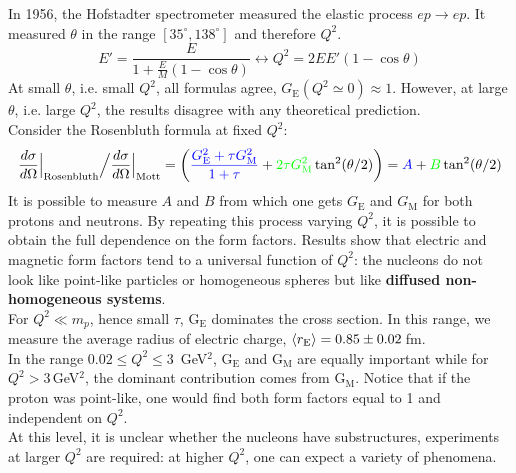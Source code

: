 \documentclass[10.75pt,a4paper,openright,bottom=2cm]{article}
\begin{document}
In 1956, the Hofstadter spectrometer measured the elastic process $ep\to ep$. It measured $\theta$ in the range $[35^\circ,138^\circ]$ and therefore $Q^2$.
\[
E'=\frac{E}{1+\frac{E}{M}(1-\cos\theta)}\longleftrightarrow Q^2=2EE'(1-\cos\theta)
\]
At small $\theta$, i.e. small $Q^2$, all formulas agree, $G_{\text{E}}(Q^2\simeq0)\approx1$. However, at large $\theta$, i.e. large $Q^2$, the results disagree with any theoretical prediction.\\ Consider the Rosenbluth formula at fixed $Q^2$:
\[
\frac{d\sigma}{d\Omega}\Bigr|_{\substack{\text{Rosenbluth}}}\Bigr/\frac{d\sigma}{d\Omega}\Bigr|_{\substack{\text{Mott}}}=\left({\color{blue}\frac{G_{\text{E}}^2+\tau G_{\text{M}}^2}{1+\tau}}+{\color{green}2\tau G_{\text{M}}^2}\tan^2(\theta/2)\right)={\color{blue}A}+{\color{green}B}\tan^2(\theta/2)
\]
It is possible to measure $A$ and $B$ from which one gets $G_{\text{E}}$ and $G_{\text{M}}$ for both protons and neutrons. By repeating this process varying $Q^2$, it is possible to obtain the full dependence on the form factors. Results show that electric and magnetic form factors tend to a universal function of $Q^2$: the nucleons do not look like point-like particles or homogeneous spheres but like \textbf{diffused non-homogeneous systems}.\\
For $Q^2\ll m_p$, hence small $\tau$, G$_{\text{E}}$ dominates the cross section. In this range, we measure the average radius of electric charge, $\Braket{r_{\text{E}}}=0.85\pm0.02$\,fm.\\
In the range $0.02\le Q^2\le3$\, GeV$^2$, G$_{\text{E}}$ and G$_{\text{M}}$ are equally important while for $Q^2>3$\,GeV$^2$, the dominant contribution comes from G$_{\text{M}}$. Notice that if the proton was point-like, one would find both form factors equal to 1 and independent on $Q^2$.\\
At this level, it is unclear whether the nucleons have substructures, experiments at larger $Q^2$ are required: at higher $Q^2$, one can expect a variety of phenomena. 
\end{document}
